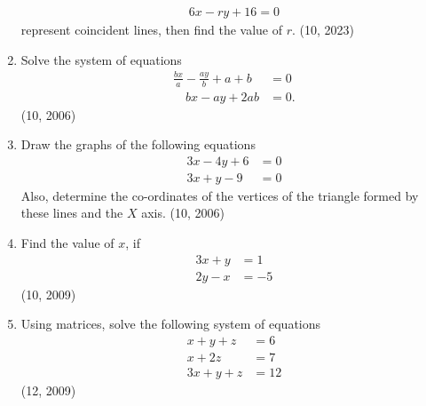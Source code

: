 \begin{enumerate}[label=\thesubsection.\arabic*,ref=\thesubsection.\theenumi]
\begin{align*}
	6x - ry + 16 = 0
\end{align*}
represent coincident lines, then find the value of $r$.
\hfill	(10, 2023)
\item Solve the system of equations
\begin{align*}
\frac{bx}{a} - \frac{a y}{b} + a + b &= 0 
	\\
	 \quad b x - a y + 2ab &= 0.
\end{align*}
\hfill	(10, 2006)
\item Draw the graphs of the following equations
\begin{align*}
3x - 4y + 6 &= 0 
	\\
	3x + y - 9 &= 0
\end{align*}
Also, determine the co-ordinates of the vertices of the triangle formed by these lines and the $X$ 
axis.
\hfill	(10, 2006)
	\item Find the value of $x$, if 
\begin{align*}
		3x+y &= 1\\ 2y-x &=-5 
\end{align*}
\hfill	(10, 2009)
	\item Using matrices, solve the following system of equations
\begin{align*}
		x+y+z &= 6\\
		x+2z &= 7\\
		3x+y+z &= 12
\end{align*}
\hfill	(12, 2009)

\end{enumerate}
